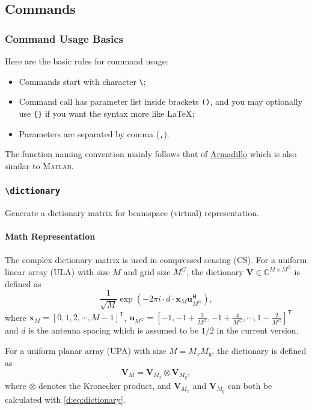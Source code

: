 \subsection{Commands}\label{d:subsec:CALC_cmd}

\subsubsection{Command Usage Basics}
Here are the basic rules for command usage:
\begin{itemize}
  \item Commands start with character \verb`\`\indextt{\textbackslash};
  \item Command call has parameter list inside brackets \verb`()`\indextt{()},
    and you may optionally use \verb`{}`\indextt{\{\}} if you want the syntax more like \LaTeX{};
  \item Parameters are separated by comma (\verb`,`\indextt{,}).
\end{itemize}
The function naming convention mainly follows that of
\href{https://arma.sourceforge.net/docs.html}{Armadillo} which is also similar to \textsc{Matlab}.

\subsubsection{\texttt{\textbackslash{}dictionary}}
Generate a dictionary matrix for beamspace (virtual) representation.
\paragraph{Math Representation}
The complex dictionary matrix is used in compressed sensing (CS).
For a uniform linear array (ULA) with size $M$ and grid size $M^G$,
the dictionary $\mathbf{V}\in\mathbb{C}^{M\times M^G}$ is defined as
\begin{equation}\label{d:eq:dictionary}
  \frac1{\sqrt{M}}\exp\left(-2\pi i\cdot d\cdot\mathbf{x}_M\mathbf{u}_{M^G}^\mathsf{H}\right),
\end{equation}
where $\mathbf{x}_M=[0,1,2,\cdots,M-1]^\mathsf{T}$,
$\mathbf{u}_{M^G}=[-1,-1+\frac2{M^G},-1+\frac4{M^G},\cdots,1-\frac2{M^G}]^\mathsf{T}$
and $d$ is the antenna spacing which is assumed to be $1/2$ in the current version.

For a uniform planar array (UPA) with size $M=M_xM_y$,
the dictionary is defined as
\begin{equation}
  \mathbf{V}_M=\mathbf{V}_{M_x}\otimes\mathbf{V}_{M_y},
\end{equation}
where $\otimes$ denotes the Kronecker product,
and $\mathbf{V}_{M_x}$ and $\mathbf{V}_{M_y}$ can both be calculated with \eqref{d:eq:dictionary}.
